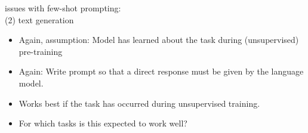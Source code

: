 \documentclass[11pt,compress,t,notes=noshow, xcolor=table]{beamer}
\begin{document}
\begin{frame}{issues with few-shot prompting:\\ (2) text generation}

\vfill

\begin{itemize}
    \item Again, assumption: Model has learned about the task during (unsupervised) pre-training 
    \item Again: Write prompt so that  a direct response must be
    given by the language model.
\item Works best if the task has occurred during
unsupervised training.
    \item \ques For which tasks is this expected to work well?
\end{itemize}

\vfill

\end{frame}




%
%
%
%
%

%
%
%
%
%
\end{document}
